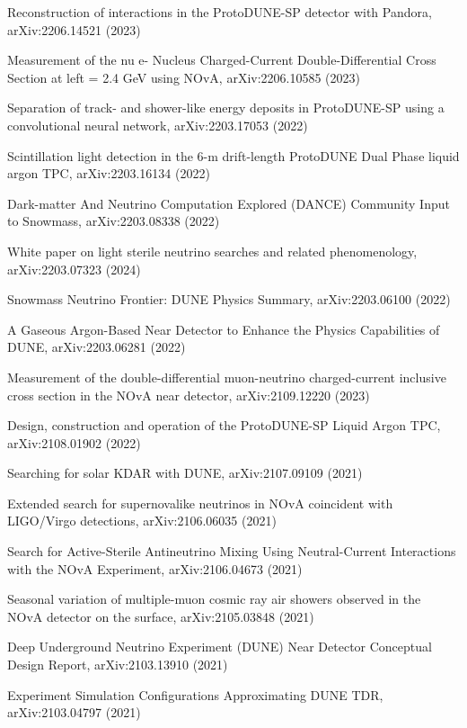 \begin{list2}
\item Reconstruction of interactions in the ProtoDUNE-SP detector with Pandora, arXiv:2206.14521 (2023) %
\item Measurement of the nu e- Nucleus Charged-Current Double-Differential Cross Section at left = 2.4 GeV using NOvA, arXiv:2206.10585 (2023) %
\item Separation of track- and shower-like energy deposits in ProtoDUNE-SP using a convolutional neural network, arXiv:2203.17053 (2022) %
\item Scintillation light detection in the 6-m drift-length ProtoDUNE Dual Phase liquid argon TPC, arXiv:2203.16134 (2022) %
\item Dark-matter And Neutrino Computation Explored (DANCE) Community Input to Snowmass, arXiv:2203.08338 (2022) %
\item White paper on light sterile neutrino searches and related phenomenology, arXiv:2203.07323 (2024) %
\item Snowmass Neutrino Frontier: DUNE Physics Summary, arXiv:2203.06100 (2022) %
\item A Gaseous Argon-Based Near Detector to Enhance the Physics Capabilities of DUNE, arXiv:2203.06281 (2022) %
\item Measurement of the double-differential muon-neutrino charged-current inclusive cross section in the NOvA near detector, arXiv:2109.12220 (2023) %
\item Design, construction and operation of the ProtoDUNE-SP Liquid Argon TPC, arXiv:2108.01902 (2022) %
\item Searching for solar KDAR with DUNE, arXiv:2107.09109 (2021) %
\item Extended search for supernovalike neutrinos in NOvA coincident with LIGO/Virgo detections, arXiv:2106.06035 (2021) %
\item Search for Active-Sterile Antineutrino Mixing Using Neutral-Current Interactions with the NOvA Experiment, arXiv:2106.04673 (2021) %
\item Seasonal variation of multiple-muon cosmic ray air showers observed in the NOvA detector on the surface, arXiv:2105.03848 (2021) %
\item Deep Underground Neutrino Experiment (DUNE) Near Detector Conceptual Design Report, arXiv:2103.13910 (2021) %
\item Experiment Simulation Configurations Approximating DUNE TDR, arXiv:2103.04797 (2021) %

\end{list2}
